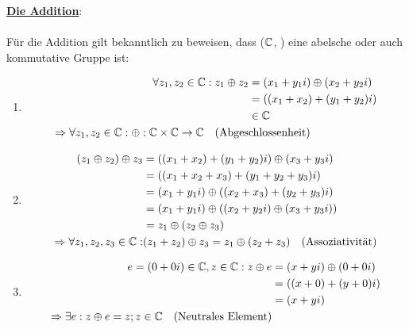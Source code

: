 	\begin{Beweis}
		\underline{\textbf{Die Addition}}:

		\paragraph{} Für die Addition gilt bekanntlich zu beweisen, dass ($\mathbb{C}$, \oplus) eine abelsche oder auch kommutative Gruppe ist:

		\begin{enumerate}[1)]
			\item \begin{align*}
						\forall z_1, z_2 \in \C: z_1 \oplus z_2 &\definedBy (x_1 + y_1i) \oplus (x_2 + y_2i) \\
														   		&= ((x_1 + x_2) + (y_1 + y_2)i) \\
														   		&\in \C \\
						\Rightarrow \forall z_1, z_2 \in \C: \oplus : \C \times \C \rightarrow \C \quad \text{(Abges}&\text{chlossenheit)}
				  \end{align*}
			\item \begin{align*}
				  		(z_1 \oplus z_2) \oplus z_3 &= ((x_1 + x_2) + (y_1 + y_2)i) \oplus (x_3 + y_3i) \\
										  			&= ((x_1 + x_2 + x_3) + (y_1 + y_2 + y_3)i) \\
												    &= (x_1 + y_1i) \oplus ((x_2 + x_3) + (y_2 + y_3)i) \\
												    &= (x_1 + y_1i) \oplus ((x_2 + y_2i) \oplus (x_3 + y_3i)) \\
												    &= z_1 \oplus (z_2 \oplus z_3) \\
						\Rightarrow \forall z_1, z_2, z_3 \in \mathbb{C}: &(z_1 + z_2) \oplus z_3 = z_1 \oplus (z_2 + z_3) \quad \text{(Assoziativität)}
				  \end{align*}
			\item \begin{align*}
						e = (0 + 0i) \in \mathbb{C}, z \in \mathbb{C}: z \oplus e &= (x + yi) \oplus (0 + 0i) \\
															 	  &= ((x + 0) + (y + 0)i) \\
															 	  &= (x + yi) \\
						\Rightarrow \exists e : z \oplus e = z; z \in \mathbb{C} \quad \text{(Neutrales Element)}&
				  \end{align*}

\end{enumerate}
\end{Beweis}
